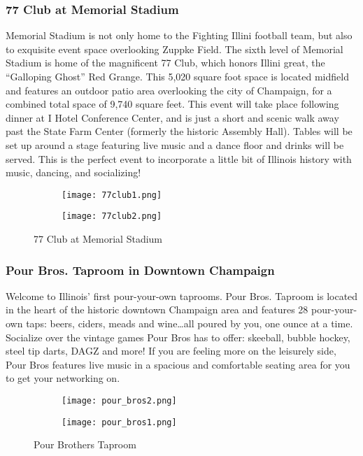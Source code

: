 \subsubsection{77 Club at Memorial Stadium}
Memorial Stadium is not only home to the Fighting Illini football team, but also to exquisite event space overlooking Zuppke Field. The sixth level of Memorial Stadium is home of the magnificent 77 Club, which honors Illini great, the ``Galloping Ghost'' Red Grange. This 5,020 square foot space is located midfield and features an outdoor patio area overlooking the city of Champaign, for a combined total space of 9,740 square feet. This event will take place following dinner at I Hotel Conference Center, and is just a short and scenic walk away past the State Farm Center (formerly the historic Assembly Hall). Tables will be set up around a stage featuring live music and a dance floor and drinks will be served. This is the perfect event to incorporate a little bit of Illinois history with music, dancing, and socializing! 
\vspace{0.5cm}\newline
\begin{figure}[H]

	\centering
	\begin{subfigure}{0.5\textwidth}
		\centering
		\texttt{[image: 77club1.png]}
	\end{subfigure}%
	\begin{subfigure}{0.5\textwidth}
		\centering
		\texttt{[image: 77club2.png]}
	\end{subfigure}
	\caption{77 Club at Memorial Stadium}		
\end{figure} 

\subsubsection{Pour Bros. Taproom in Downtown Champaign}
Welcome to Illinois' first pour-your-own taprooms. Pour Bros. Taproom is located in the heart of the historic downtown Champaign area and features 28 pour-your-own taps: beers, ciders, meads and wine\ldots all poured by you, one ounce at a time. Socialize over the vintage games Pour Bros has to offer: skeeball, bubble hockey, steel tip darts, DAGZ and more! If you are feeling more on the leisurely side, Pour Bros features live music in a spacious and comfortable seating area for you to get your networking on.
\vspace{0.5cm}\newline
\begin{figure}[H]

	\centering
	\begin{subfigure}{0.5\textwidth}
		\centering
		\texttt{[image: pour\_bros2.png]}
	\end{subfigure}%
	\begin{subfigure}{0.5\textwidth}
		\centering
		\texttt{[image: pour\_bros1.png]}
	\end{subfigure}	
	\caption{Pour Brothers Taproom}	
\end{figure} 

